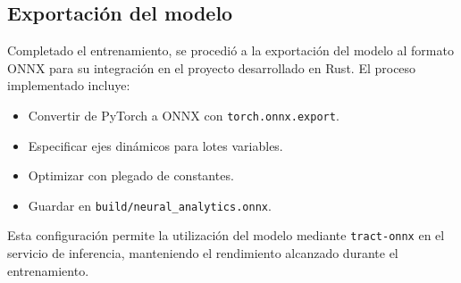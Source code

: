 \subsection{Exportación del modelo}

Completado el entrenamiento, se procedió a la exportación del modelo al formato ONNX para su integración en el proyecto desarrollado en Rust. El proceso implementado incluye:

\begin{itemize}
    \item Convertir de PyTorch a ONNX con \texttt{torch.onnx.export}.
    \item Especificar ejes dinámicos para lotes variables.
    \item Optimizar con plegado de constantes.
    \item Guardar en \texttt{build/neural\_analytics.onnx}.
\end{itemize}

Esta configuración permite la utilización del modelo mediante \texttt{tract-onnx} en el servicio de inferencia, manteniendo el rendimiento alcanzado durante el entrenamiento.